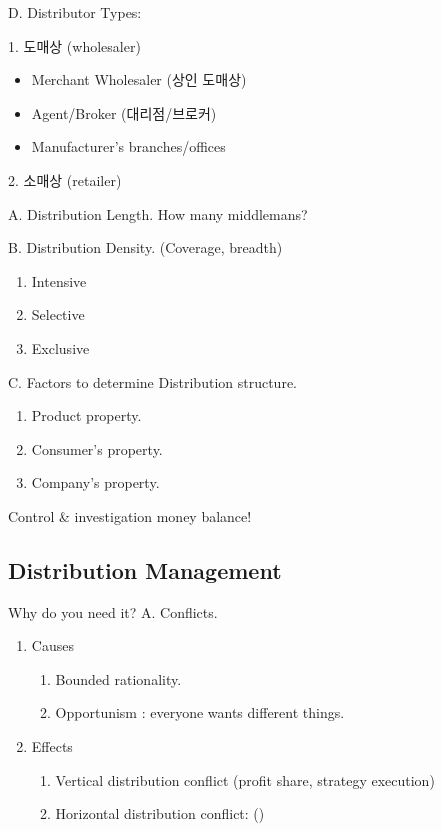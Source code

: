 \documentclass[12pt]{article}
\begin{document}
\begin{itemize}
D. Distributor Types:

1. 도매상 (wholesaler)

\begin{itemize}
	\item Merchant Wholesaler (상인 도매상)
	\item Agent/Broker (대리점/브로커)
	\item Manufacturer’s branches/offices
\end{itemize}

2. 소매상 (retailer)

A. Distribution Length.
How many middlemans?

B.  Distribution Density. (Coverage, breadth)
\begin{enumerate}
	\item Intensive
	\item Selective
	\item Exclusive
\end{enumerate}

C. Factors to determine Distribution structure.

\begin{enumerate}
	\item Product property.
	\item Consumer's property.
	\item Company's property.

\end{enumerate}

Control & investigation money balance!


\subsection{Distribution Management}
Why do you need it?
A. Conflicts.

\begin{enumerate}
	\item Causes
	\begin{enumerate}
		\item Bounded rationality.
		\item Opportunism : everyone wants different things.
	\end{enumerate}
	\item Effects
	\begin{enumerate}
		\item Vertical distribution conflict (profit share, strategy execution)
		\item Horizontal distribution conflict: ()
	\end{enumerate}
\end{enumerate}


\end{itemize}
\end{document}

